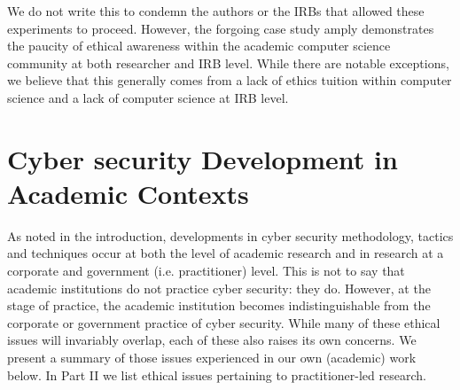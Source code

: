 \documentclass{svjour3}                     %
\begin{document}
We do not write this to condemn the authors or the IRBs that allowed these experiments to proceed. However, the forgoing case study amply demonstrates the paucity of ethical awareness within the academic computer science community at both researcher and IRB level. While there are notable exceptions, we believe that this generally comes from a lack of ethics tuition within computer science and a lack of computer science at IRB level.


\section{Cyber security Development in Academic Contexts}
\label{sec:academicdev}
As noted in the introduction, developments in cyber security methodology, tactics and techniques occur at both the level of academic research and in research at a corporate and government (i.e. practitioner) level.  This is not to say that academic institutions do not practice cyber security: they do. However, at the stage of practice, the academic institution becomes indistinguishable from the corporate or government practice of cyber security. While many of these ethical issues will invariably overlap, each of these also raises its own concerns. We present a summary of those issues experienced in our own (academic) work below. In Part II we list ethical issues pertaining to practitioner-led research.
\end{document}
